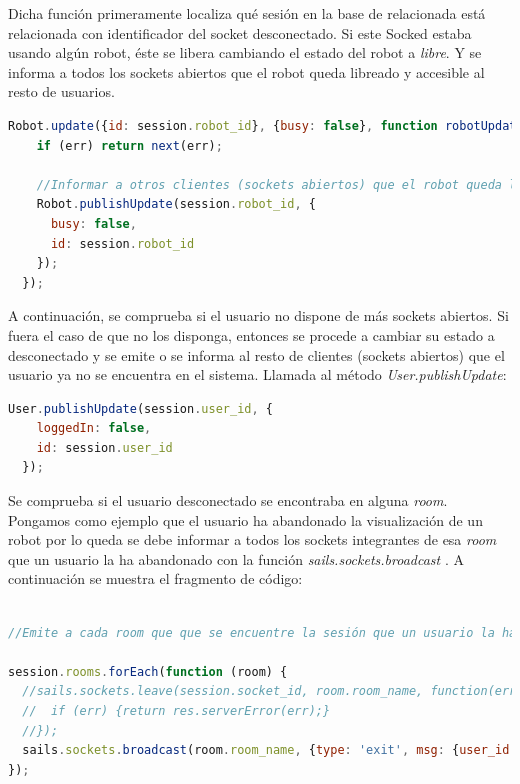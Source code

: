 Dicha función primeramente localiza qué sesión en la base de relacionada está relacionada con identificador del socket desconectado. Si este Socked estaba usando algún robot, éste se libera cambiando el estado
del robot a \emph{libre}. Y se informa a todos los sockets abiertos que el robot queda libreado y accesible al resto de usuarios.\\

\begin{lstlisting}[language=JavaScript]
  Robot.update({id: session.robot_id}, {busy: false}, function robotUpdated(err) {
    if (err) return next(err);

    //Informar a otros clientes (sockets abiertos) que el robot queda liberado
    Robot.publishUpdate(session.robot_id, {
      busy: false,
      id: session.robot_id
    });
  });
\end{lstlisting}


A continuación, se comprueba si el usuario no dispone de más sockets abiertos. Si fuera el caso de que no los disponga, entonces se procede a cambiar su estado a desconectado y se emite o se informa al resto de clientes (sockets abiertos)
que el usuario ya no se encuentra en el sistema. Llamada al método \emph{User.publishUpdate}: \\

\begin{lstlisting}[language=JavaScript]
   User.publishUpdate(session.user_id, {
    loggedIn: false,
    id: session.user_id
  });
\end{lstlisting}


Se comprueba si el usuario desconectado se encontraba en alguna \emph{room}. Pongamos como ejemplo que el usuario ha abandonado la visualización de un robot por lo queda
se debe informar a todos los sockets integrantes de esa \emph{room} que un usuario la ha abandonado con la función \emph{ sails.sockets.broadcast }. A continuación se muestra el fragmento de código:\\


\begin{lstlisting}[language=JavaScript]

//Emite a cada room que que se encuentre la sesión que un usuario la ha abandonado

session.rooms.forEach(function (room) {
  //sails.sockets.leave(session.socket_id, room.room_name, function(err) {
  //  if (err) {return res.serverError(err);}
  //});
  sails.sockets.broadcast(room.room_name, {type: 'exit', msg: {user_id: session.user_id}});
});

\end{lstlisting}



